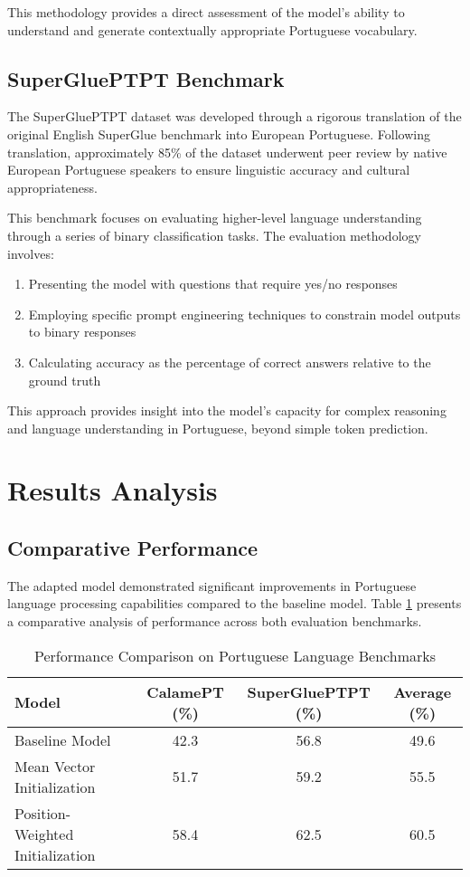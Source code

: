 This methodology provides a direct assessment of the model's ability to understand and generate contextually appropriate Portuguese vocabulary.

\subsection{SuperGluePTPT Benchmark}
The SuperGluePTPT dataset was developed through a rigorous translation of the original English SuperGlue benchmark \cite{wang2019superglue} into European Portuguese. Following translation, approximately 85\% of the dataset underwent peer review by native European Portuguese speakers to ensure linguistic accuracy and cultural appropriateness.

This benchmark focuses on evaluating higher-level language understanding through a series of binary classification tasks. The evaluation methodology involves:

\begin{enumerate}
    \item Presenting the model with questions that require yes/no responses
    \item Employing specific prompt engineering techniques to constrain model outputs to binary responses
    \item Calculating accuracy as the percentage of correct answers relative to the ground truth
\end{enumerate}

This approach provides insight into the model's capacity for complex reasoning and language understanding in Portuguese, beyond simple token prediction.

\section{Results Analysis}
\subsection{Comparative Performance}
The adapted model demonstrated significant improvements in Portuguese language processing capabilities compared to the baseline model. Table \ref{tab:benchmark_results} presents a comparative analysis of performance across both evaluation benchmarks.

\begin{table}[h]
\centering
\caption{Performance Comparison on Portuguese Language Benchmarks}
\label{tab:benchmark_results}
\begin{tabular}{lccc}
\hline
\textbf{Model} & \textbf{CalamePT (\%)} & \textbf{SuperGluePTPT (\%)} & \textbf{Average (\%)} \\
\hline
Baseline Model & 42.3 & 56.8 & 49.6 \\
Mean Vector Initialization & 51.7 & 59.2 & 55.5 \\
Position-Weighted Initialization & 58.4 & 62.5 & 60.5 \\
\hline
\end{tabular}
\end{table}

